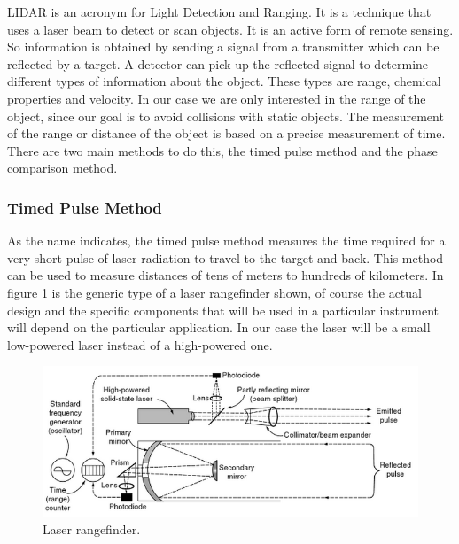 \documentclass{article}
\begin{document}
LIDAR is an acronym for Light Detection and Ranging. It is a technique that uses a laser beam to detect or scan objects. It is an active form of remote sensing. So information is obtained by sending a signal from a transmitter which can be reflected by a target. A detector can pick up the reflected signal to determine different types of information about the object. These types are range, chemical properties and velocity.
In our case we are only interested in the range of the object, since our goal is to avoid collisions with static objects. The measurement of the range or distance of the object is based on a precise measurement of time. There are two main methods to do this, the timed pulse method and the phase comparison method.


\subsubsection{Timed Pulse Method}

As the name indicates, the timed pulse method measures the time required for a very short pulse of laser radiation to travel to the target and back. This method can be used to measure distances of tens of meters to hundreds of kilometers. In figure \ref{lidar1} is the generic type of a laser rangefinder shown, of course the actual design and the specific components that will be used in a particular instrument will depend on the particular application. In our case the laser will be a small low-powered laser instead of a high-powered one.

\begin{figure}[H]
	\centering
	\includegraphics[scale=0.8]{figures/TimedPulse}
	\caption{Laser rangefinder. }
	\label{lidar1}
\end{figure}
\end{document}
